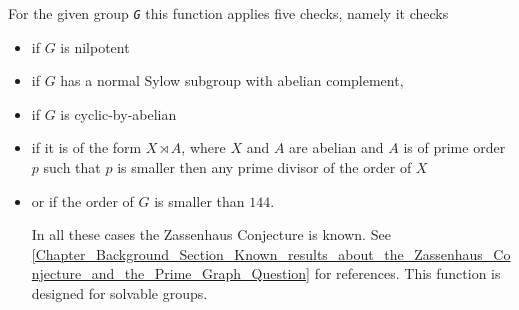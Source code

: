 \documentclass[a4paper,11pt]{report}
\begin{document}
{{{ For the given group \mbox{\texttt{\mdseries\slshape G}} this function applies five checks, namely it checks 
\begin{itemize}
\item  if $G$ is nilpotent 
\item  if $G$ has a normal Sylow subgroup with abelian complement, 
\item  if $G$ is cyclic-by-abelian 
\item  if it is of the form $X \rtimes A$, where $X$ and $A$ are abelian and $A$ is of prime order $p$ such that $p$ is smaller then any prime divisor of the order of $X$ 
\item  or if the order of $G$ is smaller than $144$. 

 In all these cases the Zassenhaus Conjecture is known. See \ref{Chapter_Background_Section_Known_results_about_the_Zassenhaus_Conjecture_and_the_Prime_Graph_Question} for references. This function is designed for solvable groups. 
\end{itemize}
 }

 }

 }

   
\end{document}
